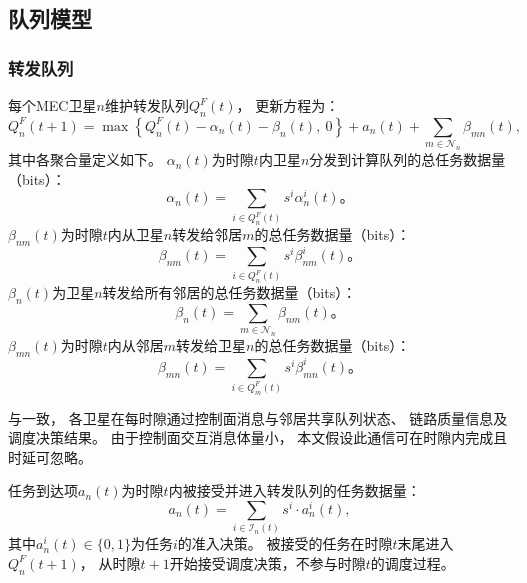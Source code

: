 \documentclass[a4paper,11pt]{article}
\begin{document}
\subsection{队列模型}

\subsubsection{转发队列}

每个MEC卫星$n$维护转发队列$Q^F_n(t)$，
更新方程为\cite{zhang2024mhspo}：
\begin{equation}
    Q^F_n(t\!+\!1) = \max\!\left\{Q^F_n(t)
    - \alpha_n(t) - \beta_n(t),~0\right\}
    + a_n(t)
    + \sum_{m \in \mathcal{N}_n}\!\beta_{mn}(t),
    \label{eq:QF_update}
\end{equation}
其中各聚合量定义如下。
$\alpha_n(t)$为时隙$t$内卫星$n$分发到计算队列的总任务数据量（bits）：
\begin{equation}
    \alpha_n(t) = \sum_{i \in Q^F_n(t)} s^i \alpha^i_n(t)。
\end{equation}
$\beta_{nm}(t)$为时隙$t$内从卫星$n$转发给邻居$m$的总任务数据量（bits）：
\begin{equation}
    \beta_{nm}(t) = \sum_{i \in Q^F_n(t)} s^i \beta^i_{nm}(t)。
\end{equation}
$\beta_n(t)$为卫星$n$转发给所有邻居的总任务数据量（bits）：
\begin{equation}
    \beta_n(t) = \sum_{m \in \mathcal{N}_n} \beta_{nm}(t)。
\end{equation}
$\beta_{mn}(t)$为时隙$t$内从邻居$m$转发给卫星$n$的总任务数据量（bits）：
\begin{equation}
    \beta_{mn}(t) = \sum_{i \in Q^F_m(t)} s^i \beta^i_{mn}(t)。
\end{equation}

与\cite{zhang2024mhspo}一致，
各卫星在每时隙通过控制面消息与邻居共享队列状态、
链路质量信息及调度决策结果。
由于控制面交互消息体量小，
本文假设此通信可在时隙内完成且时延可忽略。

任务到达项$a_n(t)$为时隙$t$内被接受并进入转发队列的任务数据量：
\begin{equation}
    a_n(t) = \sum_{i \in \mathcal{I}_n(t)} s^i \cdot a^i_n(t),
    \label{eq:arrival}
\end{equation}
其中$a^i_n(t) \in \{0,1\}$为任务$i$的准入决策。
被接受的任务在时隙$t$末尾进入$Q^F_n(t+1)$，
从时隙$t+1$开始接受调度决策，不参与时隙$t$的调度过程。
\end{document}
